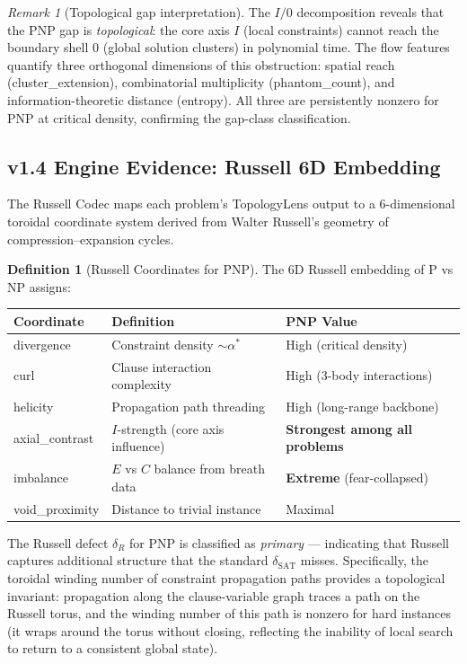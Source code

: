 \documentclass[11pt]{article}
\theoremstyle{definition}
\newtheorem{definition}[theorem]{Definition}
\theoremstyle{remark}
\newtheorem{remark}[theorem]{Remark}
\begin{document}
\begin{remark}[Topological gap interpretation]
The $I/0$ decomposition reveals that the PNP gap is \emph{topological}: the
core axis $I$ (local constraints) cannot reach the boundary shell $0$ (global
solution clusters) in polynomial time.  The flow features quantify three
orthogonal dimensions of this obstruction: spatial reach (cluster\_extension),
combinatorial multiplicity (phantom\_count), and information-theoretic
distance (entropy).  All three are persistently nonzero for PNP at critical
density, confirming the gap-class classification.
\end{remark}

\subsection{v1.4 Engine Evidence: Russell 6D Embedding}
\label{sec:russell-pnp}

The Russell Codec maps each problem's TopologyLens output to a 6-dimensional
toroidal coordinate system derived from Walter Russell's geometry of
compression--expansion cycles.

\begin{definition}[Russell Coordinates for PNP]
\label{def:russell-pnp}
The 6D Russell embedding of P vs NP assigns:
\begin{center}
\begin{tabular}{@{}lll@{}}
\toprule
\textbf{Coordinate} & \textbf{Definition} & \textbf{PNP Value} \\
\midrule
divergence & Constraint density $\sim \alpha^*$ & High (critical density) \\
curl & Clause interaction complexity & High (3-body interactions) \\
helicity & Propagation path threading & High (long-range backbone) \\
axial\_contrast & $I$-strength (core axis influence) & \textbf{Strongest among all problems} \\
imbalance & $E$ vs $C$ balance from breath data & \textbf{Extreme} (fear-collapsed) \\
void\_proximity & Distance to trivial instance & Maximal \\
\bottomrule
\end{tabular}
\end{center}
\end{definition}

\noindent
The Russell defect $\delta_R$ for PNP is classified as \emph{primary} ---
indicating that Russell captures additional structure that the standard
$\delta_{\mathrm{SAT}}$ misses.  Specifically, the toroidal winding number
of constraint propagation paths provides a topological invariant:
propagation along the clause-variable graph traces a path on the Russell
torus, and the winding number of this path is nonzero for hard instances
(it wraps around the torus without closing, reflecting the inability of
local search to return to a consistent global state).
\end{document}
